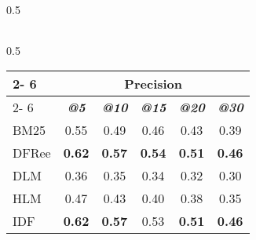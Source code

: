 \begin{table*}[]
\begin{small}
\begin{subtable}[b]{0.5\textwidth}
\begin{tabular}{l|c|c|c|c|c}
 	  	\hline
 	  	\end{tabular}
 	  	
 	  	
 	  	 \end{subtable}

 	 \vspace{0.5cm}
 	 \hspace{3.5cm}
  	  	\begin{subtable}[b]{0.5\textwidth}
 	  	 	
 	  	  	\centering
 	  	  	\caption{All collections} 
 	  	 
 	  	 	\begin{tabular}{l|c|c|c|c|c} 
 	  	 	
 	  	 	\cline{2- 6}
 	  	 	\multicolumn{1}{c}{}&\multicolumn{5}{c}{Precision} \\ 
 	  	 	\cline{2- 6} &
 	  	 	\textit{\textbf{@5}} & 
 	  	 	\textit{\textbf{@10}} & 
 	  	 	\textit{\textbf{@15}} & 
 	  	 	\textit{\textbf{@20}} & 
 	  	 	\textit{\textbf{@30}} 
 	  	 	
 	  	 	\tabularnewline
 	  	 	\hline
 	 	 	 BM25 & 0.55 & 0.49 & 0.46 & 0.43 & 0.39 \\
 	 	 	 DFRee  & \textbf{0.62} & \textbf{0.57} & \textbf{0.54} & \textbf{0.51} & \textbf{0.46} \\
 	 	 	 DLM  & 0.36 & 0.35 & 0.34 & 0.32 & 0.30 \\
 	 	 	 HLM  & 0.47 & 0.43 & 0.40 & 0.38 & 0.35 \\
 	 	 	 IDF  & \textbf{0.62} & \textbf{0.57} & 0.53 & \textbf{0.51} & \textbf{0.46} \\
 	  	 
 	  	  	\hline
 	  	  	\end{tabular}
 	  	  	
 	  	 
 	  	  	
 		\end{subtable}
 	 
 	 
  	\label{traditional}
  	  \vspace{0.7cm}
  	  \end{small}
 \end{table*}